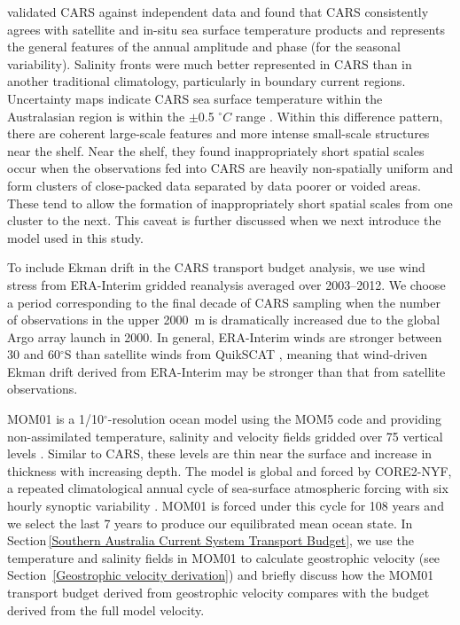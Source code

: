 \documentclass[preprint,3p,review,12pt]{elsarticle}
\newcommand{\dg}{$^{\circ}$}
\begin{document}
\citet{Ridgway2002} validated CARS against independent data and found that CARS consistently agrees with satellite and in-situ sea surface temperature products and represents the general features of the annual amplitude and phase (for the seasonal variability). Salinity fronts were much better represented in CARS than in another traditional climatology, particularly in boundary current regions. Uncertainty maps indicate CARS sea surface temperature within the Australasian region is within the $\pm$0.5 $^{\circ}C$ range \citep{Ridgway2002}. Within this difference pattern, there are coherent large-scale features and more intense small-scale structures near the shelf. Near the shelf, they found inappropriately short spatial scales occur when the observations fed into CARS are heavily non-spatially uniform and form clusters of close-packed data separated by data poorer or voided areas. These tend to allow the formation of inappropriately short spatial scales from one cluster to the next. This caveat is further discussed when we next introduce the model used in this study.

To include Ekman drift in the CARS transport budget analysis, we use wind stress from ERA-Interim gridded reanalysis \citep{Dee2011} averaged over 2003--2012. We choose a period corresponding to the final decade of CARS sampling when the number of observations in the upper \SI{2000}{m} is dramatically increased due to the global Argo array launch in 2000. In general, ERA-Interim winds are stronger between 30 and 60\dg S than satellite winds from QuikSCAT \citep{Chaudhuri2013}, meaning that wind-driven Ekman drift derived from ERA-Interim may be stronger than that from satellite observations.

MOM01 is a 1/10\dg-resolution ocean model using the MOM5 code \citep{Griffies2012} and providing non-assimilated temperature, salinity and velocity fields gridded over 75 vertical levels \citep{Stewart2017}. Similar to CARS, these levels are thin near the surface and increase in thickness with increasing depth.
The model is global and forced by CORE2-NYF, a repeated climatological annual cycle of sea-surface atmospheric forcing with six hourly synoptic variability \citep{Large2009}.
MOM01 is forced under this cycle for 108 years and we select the last 7 years to produce our equilibrated mean ocean state. In Section\,\ref{Southern Australia Current System Transport Budget}, we use the temperature and salinity fields in MOM01 to calculate geostrophic velocity (see Section~\ref{Geostrophic velocity derivation}) and briefly discuss how the MOM01 transport budget derived from geostrophic velocity compares with the budget derived from the full model velocity.
\end{document}
